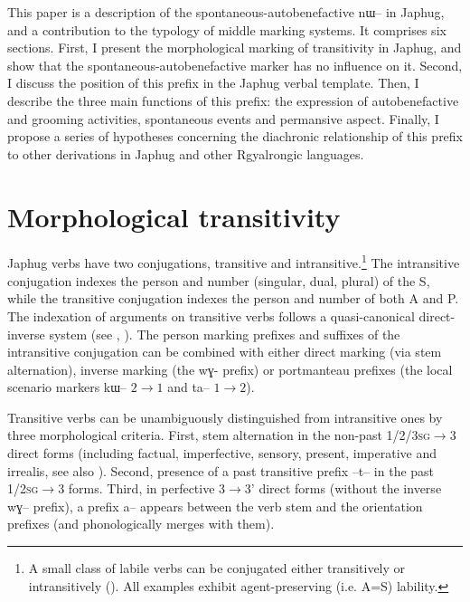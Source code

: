 \documentclass[oldfontcommands,oneside,a4paper,11pt]{article}
\newcommand{\ipa}[1]{{\phon \mbox{#1}}} %
\begin{document}
 
 This paper is a description of the spontaneous-autobenefactive  \ipa{nɯ--}  in Japhug, and a contribution to the typology of middle marking systems. It comprises six sections. First, I present the morphological marking  of transitivity in Japhug, and show that the spontaneous-autobenefactive marker has no influence on it. Second, I discuss the position of this prefix  in the Japhug verbal template. Then, I describe the three main functions of this prefix: the expression of autobenefactive and grooming activities, spontaneous events and permansive aspect. Finally, I propose a series of hypotheses concerning the diachronic relationship of this prefix to other derivations in Japhug and other Rgyalrongic languages. 
 

\section{Morphological transitivity}

Japhug verbs have two conjugations, transitive and intransitive.\footnote{A  small class of labile verbs can be conjugated either transitively or intransitively (\citealt{jacques12demotion}). All examples exhibit agent-preserving  (i.e. A=S) lability.} The intransitive conjugation indexes the person and number (singular, dual, plural) of the S, while the transitive conjugation indexes the person and number of both A and P. The indexation of arguments on transitive verbs follows a quasi-canonical direct-inverse system (see \citealt{delancey81direction, jackson02rentongdengdi, jacques10inverse}, \citealt{jacques14inverse, gongxun14agreement}). The person marking prefixes and suffixes of the intransitive conjugation can be combined with either direct marking (via stem alternation), inverse marking (the \ipa{wɣ-} prefix) or portmanteau prefixes (the local scenario markers \ipa{kɯ--} $2\rightarrow1$ and \ipa{ta--} $1\rightarrow2$).

Transitive verbs can be unambiguously distinguished from intransitive ones by three morphological criteria. First, stem alternation in the non-past  \textsc{1/2/3sg}$\rightarrow$3 direct forms (including factual, imperfective, sensory, present, imperative and irrealis, see also \citealt{jackson00puxi,jackson07irrealis}). Second, presence of a past transitive prefix \ipa{--t--} in the past \textsc{1/2sg}$\rightarrow$3 forms. Third, in perfective 3$\rightarrow$3' direct forms (without the inverse \ipa{wɣ--} prefix), a prefix \ipa{a--}  appears between the verb stem and the orientation prefixes (and phonologically merges with them).
\end{document}
